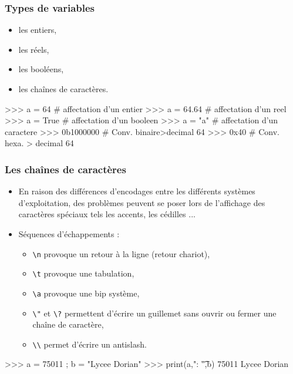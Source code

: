 \begin{frame}[fragile]
\frametitle{Types de variables}

\begin{itemize}
 \item les entiers,
 \item les réels,
 \item les booléens,
 \item les chaînes de caractères.
\end{itemize}

\begin{GrayBox}[0.75\textwidth]
\begin{verbatimtab}[3]
>>> a = 64 # affectation d'un entier
>>> a = 64.64 # affectation d'un reel
>>> a = True # affectation d'un booleen
>>> a = "a" # affectation d'un caractere
>>> 0b1000000 # Conv. binaire>decimal
	64
>>> 0x40 # Conv. hexa. > decimal
	64
\end{verbatimtab}
\end{GrayBox}
\end{frame}

\begin{frame}[fragile]
\frametitle{Les chaînes de caractères}

\begin{rem}
\begin{itemize}
 \item En raison des différences d'encodages entre les différents systèmes d'exploitation, des problèmes peuvent se poser
lors de l'affichage des caractères spéciaux tels les accents, les cédilles ...
 \item Séquences d'échappements :
 \begin{itemize}
  \item \verb|\n| provoque un retour à la ligne (retour chariot),
  \item \verb|\t| provoque une tabulation,
  \item \verb|\a| provoque une bip système,
  \item \verb|\"| et \verb|\?| permettent d'écrire un guillemet sans ouvrir ou fermer une chaîne de caractère,
  \item \verb|\\| permet d'écrire un antislash.
 \end{itemize}
\end{itemize}
\end{rem}

\begin{GrayBox}[0.75\textwidth]
\begin{verbatimtab}[3]
>>> a = 75011 ; b = "Lycee Dorian"
>>> print(a,": \t",b)
	75011 Lycee Dorian
\end{verbatimtab}
\end{GrayBox}
\end{frame}

